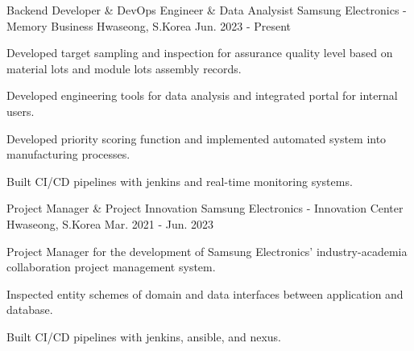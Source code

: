 

\begin{cventries}

  \cventry
    {Backend Developer \& DevOps Engineer \& Data Analysist} %
    {Samsung Electronics - Memory Business} %
    {Hwaseong, S.Korea} %
    {Jun. 2023 - Present} %
    {
      \begin{cvitems} %
        \item {Developed target sampling and inspection for assurance quality level based on material lots and module lots assembly records.}
        \item {Developed engineering tools for data analysis and integrated portal for internal users.}
        \item {Developed priority scoring function and implemented automated system into manufacturing processes.}
        \item {Built CI/CD pipelines with jenkins and real-time monitoring systems.} 
      \end{cvitems}
    }

  \cventry
  {Project Manager \& Project Innovation} %
  {Samsung Electronics - Innovation Center} %
  {Hwaseong, S.Korea} %
  {Mar. 2021 - Jun. 2023} %
  {
    \begin{cvitems} %
      \item {Project Manager for the development of Samsung Electronics' industry-academia collaboration project management system.}
      \item {Inspected entity schemes of domain and data interfaces between application and database.}
      \item {Built CI/CD pipelines with jenkins, ansible, and nexus.}
    \end{cvitems}
  }
\end{cventries}
